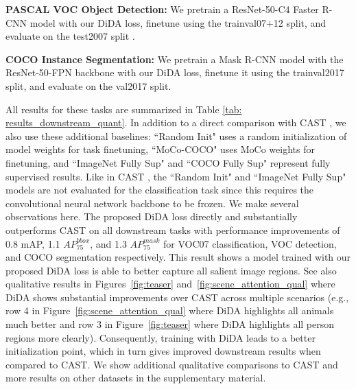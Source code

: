 \documentclass[10pt,twocolumn,letterpaper]{article}
\begin{document}
\textbf{PASCAL VOC Object Detection:} We pretrain a ResNet-50-C4 \cite{he2016deep} Faster R-CNN \cite{ren2015faster,ren2016fasterpami} model with our DiDA loss, finetune using the trainval07+12 split, and evaluate on the test2007 split \cite{pascal-voc-2007}. 

\textbf{COCO Instance Segmentation:} We pretrain a Mask R-CNN \cite{he2017mask} model with the ResNet-50-FPN \cite{lin2017feature} backbone with our DiDA loss, finetune it using the trainval2017 split, and evaluate on the val2017 split. 

All results for these tasks are summarized in Table \ref{tab: results_downstream_quant}. In addition to a direct comparison with CAST \cite{selvaraju2021casting}, we also use these additional baselines: ``Random Init" uses a random initialization of model weights for task finetuning, ``MoCo-COCO" uses MoCo \cite{he2020momentum} weights for finetuning, and ``ImageNet Fully Sup" and ``COCO Fully Sup" represent fully supervised results. Like in CAST \cite{selvaraju2021casting}, the ``Random Init" and ``ImageNet Fully Sup" models are not evaluated for the classification task since this requires the convolutional neural network backbone to be frozen. We make several observations here. The proposed DiDA loss directly and substantially outperforms CAST on all downstream tasks with performance improvements of 0.8 mAP, 1.1 $AP^{bbox}_{75}$, and 1.3 $AP^{mask}_{75}$ for VOC07 classification, VOC detection, and COCO segmentation respectively. This result shows a model trained with our proposed DiDA loss is able to better capture all salient image regions. See also qualitative results in Figures~\ref{fig:teaser} and~\ref{fig:scene_attention_qual} where DiDA shows substantial improvements over CAST across multiple scenarios (e.g., row 4 in Figure~\ref{fig:scene_attention_qual} where DiDA highlights all animals much better and row 3 in Figure~\ref{fig:teaser} where DiDA highlights all person regions more clearly). Consequently, training with DiDA leads to a better initialization point, which in turn gives improved downstream results when compared to CAST. We show additional qualitative comparisons to CAST and more results on other datasets in the supplementary material.
\end{document}
